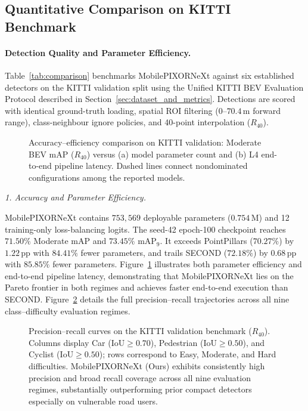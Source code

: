 \subsection{Quantitative Comparison on KITTI Benchmark}
\label{sec:benchmark_comparison}



\paragraph{Detection Quality and Parameter Efficiency.}
Table~\ref{tab:comparison} benchmarks MobilePIXORNeXt against six established detectors on the KITTI validation split using the Unified KITTI BEV Evaluation Protocol described in Section~\ref{sec:dataset_and_metrics}. Detections are scored with identical ground-truth loading, spatial ROI filtering ($0\text{--}70.4\,\text{m}$ forward range), class-neighbour ignore policies, and 40-point interpolation ($R_{40}$).

\begin{figure}[t]
\centering
{}
\caption{Accuracy--efficiency comparison on KITTI validation: Moderate BEV mAP ($R_{40}$) versus (a) model parameter count and (b) L4 end-to-end pipeline latency. Dashed lines connect nondominated configurations among the reported models.}
\label{fig:pareto_tradeoff}
\end{figure}

\textit{1. Accuracy and Parameter Efficiency.}

MobilePIXORNeXt contains $753{,}569$ deployable parameters ($0.754\,\text{M}$) and 12 training-only loss-balancing logits. The seed-42 epoch-100 checkpoint reaches $71.50\%$ Moderate mAP and $73.45\%$ $\mathrm{mAP}_9$. It exceeds PointPillars ($70.27\%$) by $1.22\,\text{pp}$ with $84.41\%$ fewer parameters, and trails SECOND ($72.18\%$) by $0.68\,\text{pp}$ with $85.85\%$ fewer parameters. Figure~\ref{fig:pareto_tradeoff} illustrates both parameter efficiency and end-to-end pipeline latency, demonstrating that MobilePIXORNeXt lies on the Pareto frontier in both regimes and achieves faster end-to-end execution than SECOND. Figure~\ref{fig:pr_curves} details the full precision--recall trajectories across all nine class--difficulty evaluation regimes.

\begin{figure}[!t]
\centering
{}
\caption{Precision--recall curves on the KITTI validation benchmark ($R_{40}$). Columns display Car ($\text{IoU} \ge 0.70$), Pedestrian ($\text{IoU} \ge 0.50$), and Cyclist ($\text{IoU} \ge 0.50$); rows correspond to Easy, Moderate, and Hard difficulties. MobilePIXORNeXt (Ours) exhibits consistently high precision and broad recall coverage across all nine evaluation regimes, substantially outperforming prior compact detectors especially on vulnerable road users.}
\label{fig:pr_curves}
\end{figure}

